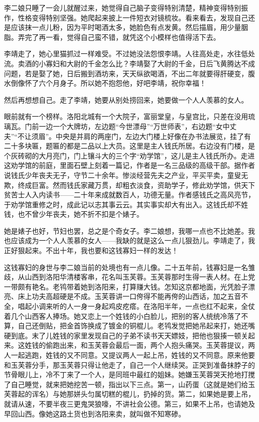 李二娘只睡了一会儿就醒过来，她觉得自己脑子变得特别清楚，精神变得特别振作，性格变得特别坚强。她爬起来披上一件短衣对镜梳妆。看来看去，发现自己还是应该抹一点儿粉，因为平时喝酒太多，她脸色有点发黄。然后描眉，用少量胭脂。弄完了再一看，觉得自己蛮不错，就凭这个小模样也值得活下去。

李靖走了，她心里猫抓过一样难受。不过她没法怨恨李靖。人往高处走，水往低处流。卖酒的小寡妇和大尉的千金怎么比？李靖娶了大尉的千金，日后飞黄腾达不成问题，若是娶了她，日后搬到酒坊来，天天纵欲喝酒，不出二年就要得肝硬变，腹水倒像怀了六个月身子。所以她不抱怨他，好吧李靖，祝你幸福！

然后再想想自己。走了李靖，她要从别处捞回来，她要做一个人人羡慕的女人。

眼前就有一个榜样。洛阳北城有一个大院子，富丽堂皇，与皇宫比，只差在没用琉璃瓦。门前一边一个大牌坊，左边题“今世漂母”“万世师表”，右边题“女中丈夫”“不让须眉”。中央是并肩的两座门，左边大门楼上好像在办书法展览，挂了有二十多块匾，题匾的都是二品以上大员。这里是主人钱氏所居。右边没有门楼，是个灰砖砌的大月亮门，门上镶斗大的三个字“劝学馆”，这儿是主人钱氏所办。走进这劝学馆的前庭，里面石壁上刻着一篇记，作者是一名三品级的高级干部。据作者说钱氏少年丧夫无子，守节二十余年。惨淡经营先夫之产业，平买平卖，童叟无欺，终成巨富。然而钱氏家藏万贯，却粗衣淡食，资助学子，修此劝学馆，供天下贫苦士人入内读书——二十年来成就数百人，功德无量。作者感钱氏之高风亮节，于劝学馆重修之时，成此记以志其事云云。其实事实却大有出入。这钱氏却不姓钱，也不曾少年丧夫，她不折不扣是个婊子。

她是婊子也好，节妇也罢，总之是个奇女子。李二娘想，我哪一点也不比她差。我也应该成为一个人人羡慕的女人——我缺的就是这么一点儿狠劲儿。李靖走了，我正好狠起来。不出十年，我也要和这钱寡妇一样的发达！

这钱寡妇的身世与李二娘当前的处境也有一点儿像。二十五年前，钱寡妇是一名雏歧，从山西到洛阳华清楼客串，花名叫玉芙蓉。玉芙蓉那时生得一表人材。在上党一带颇有艳名。老鸨带着她到洛阳来，打算赚大钱。怎知这京都地面，光凭脸子漂亮、床上功夫高超硬是不成。玉芙蓉讲一口侉得不能再侉的山西话，加之五音不全，唱起小调来听的人一身一身起鸡皮疙瘩。在洛阳半年，一点也红不起来，全仗着几个山西客人捧场。她又恋上一个姓钱的小白脸儿，把别的客人统统冷落了不算，自己还倒贴，把金首饰换成了镀金的铜棍儿。老鸨发觉把她吊起来打，她还嘴硬到底。末了儿姓钱的家里发现自己的子弟不读书天天嫖妓，把他也狠揍一顿关起来。这姓钱的偷跑出来，和玉芙蓉会最后一面，两个人抱头痛哭。玉芙蓉提议，两人一起逃跑，姓钱的又不同意。又提议两人一起上吊，姓钱的又不同意。原来他要和玉芙蓉分手，那玉芙蓉只得让他走了，自己一个人继续哭。正哭到准备抹脖子的节骨眼儿上，冷不丁来了一个人，是同班中最红的姐妹。她嫌玉芙蓉哭天抢地打搅了自己睡觉，就来把她挖苦一顿，指出以下三点。第一，山药蛋（这就是她们给玉芙蓉起的诨名）与她那姘头匀属切糕的棍儿，扔掉的货。第二，如果她是要上吊，就请从速，不要半夜三更鬼哭狼嚎，不讲社会公德。第三，如果不上吊，也请她及早回山西。像她这路土货也到洛阳来卖，就叫做不知寒碜。


